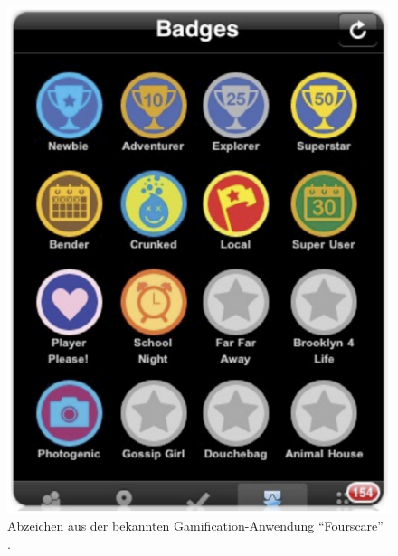 \documentclass[a4paper,12pt,twoside]{scrartcl}
\begin{document}
\\
\begin{figure}[h!]
\begin{center}
\includegraphics[scale = 0.45]{Bilder/Abzeichen.eps}
\caption{Abzeichen aus der bekannten Gamification-Anwendung \enquote{Fourscare} \cite{Zichermann2011}.}
\label{Abzeichen}
\end{center}
\end{figure} 
\end{document}
